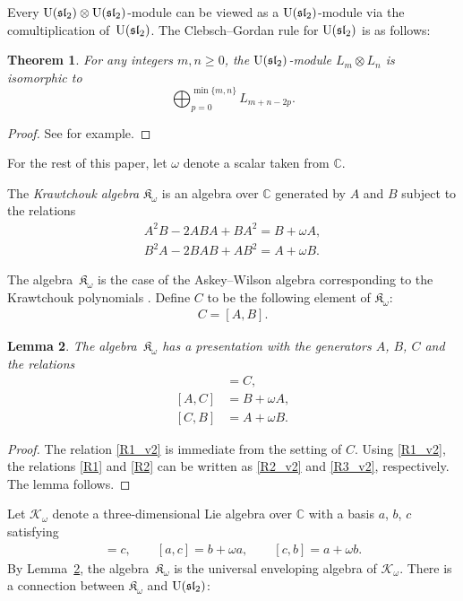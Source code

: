 \documentclass[pdftex]{sigma}%
\def\C{\mathbb C}
\def\K{\mathfrak K_\omega}
\def\U{{\rm U}(\mathfrak{sl}_2)}
\numberwithin{equation}{section}
\newtheorem{Theorem}{Theorem}[section]
\newtheorem{Lemma}[Theorem]{Lemma}
\begin{document}
Every $\U\otimes \U$-module can be viewed as a $\U$-module via the comultiplication of~$\U$.
The Clebsch--Gordan rule for $\U$ is as follows:

\begin{Theorem}\label{thm:CGrule_U}
For any integers $m,n\geq 0$, the $\U$-module $L_m\otimes L_n$ is isomorphic to
\[
\bigoplus_{p=0}^{\min\{m,n\}}L_{m+n-2p}.
\]
\end{Theorem}
\begin{proof}
See \cite[Section V.5]{kassel} for example.
\end{proof}

For the rest of this paper, let $\omega$ denote a scalar taken from $\C$.

\begin{Definition}\label{defn:K}
The {\it Krawtchouk algebra} $\K$ is an algebra over $\C$ generated by $A$ and $B$ subject to the relations
\begin{gather}
A^2 B-2 ABA +B A^2
=
B+\omega A,
\label{R1}
\\
B^2A-2 BAB+AB^2
=
A+\omega B.
\label{R2}
\end{gather}
\end{Definition}
The algebra~$\K$ is the case of the Askey--Wilson algebra corresponding to the Krawtchouk polynomials \cite[Lemma 7.2]{Vidunas:2007}.
Define $C$ to be the following element of $\K$:
\begin{gather*}
C=[A,B].
\end{gather*}



\begin{Lemma}\label{lem:presentation_K}
The algebra~$\K$ has a presentation with the generators $A$, $B$, $C$ and the relations
\begin{align}
[A,B] &=C,
\label{R1_v2}
\\
[A,C]&=B+\omega A,
\label{R2_v2}
\\
[C,B]&=A+\omega B.
\label{R3_v2}
\end{align}
\end{Lemma}
\begin{proof}
The relation \eqref{R1_v2} is immediate from the setting of $C$. Using \eqref{R1_v2}, the relations \eqref{R1} and \eqref{R2} can be written as \eqref{R2_v2} and \eqref{R3_v2}, respectively. The lemma follows.
\end{proof}




Let $\mathcal K_\omega$ denote a three-dimensional Lie algebra over $\C$ with a basis $a$, $b$, $c$ satisfying
\begin{gather*}
[a,b]=c,
\qquad
[a,c]=b+\omega a,
\qquad
[c,b]=a+\omega b.
\end{gather*}
By Lemma~\ref{lem:presentation_K}, the algebra~$\K$ is the universal enveloping algebra of $\mathcal K_\omega$. There is a connection between $\K$ and $\U$:
\end{document}
